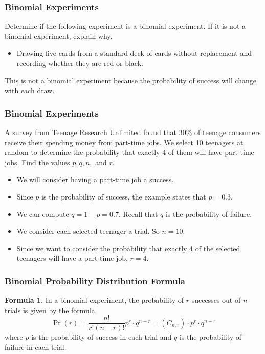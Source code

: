 \documentclass{beamer}
\theoremstyle{definition}
\newtheorem{formula}{Formula}
\begin{document}
\begin{frame}
\frametitle{Binomial Experiments}
\begin{example}
Determine if the following experiment  is a binomial experiment.  If it is not a binomial experiment, explain why.
\begin{itemize}
\item Drawing five cards from a standard deck of cards without replacement and recording whether they are red or black.
\end{itemize}
\end{example}\pause
This is not a binomial experiment because the probability of success will change with each draw.
\vspace*{3in}
\end{frame}

\begin{frame}
\frametitle{Binomial Experiments}\pause
\begin{example}
A survey from Teenage Research Unlimited found that $30 \%$ of
teenage consumers receive their spending money from part-time jobs.
We select 10 teenagers at random to determine the probability that exactly 4 of them will have part-time jobs.  Find the values $p,q,n,$ and $r$.
\end{example}\pause
\begin{itemize}
\item We will consider having a part-time job a success.\pause
\item Since $p$ is the probability of success, the example states that $p=0.3$.\pause
\item We can compute $q=1-p=0.7$.  Recall that $q$ is the probability of failure.\pause
\item We consider each selected teenager a trial.  So $n=10$.\pause
\item Since we want to consider the probability that exactly 4 of the selected teenagers will have a part-time job, $r=4$.
\end{itemize}
\end{frame}

\begin{frame}
\frametitle{Binomial Probability Distribution Formula}\pause
\begin{formula}
In a binomial experiment, the probability of $r$ successes out of $n$ trials is given by the formula
$$\Pr(r)=\frac{n!}{r!(n-r)!}p^r\cdot q^{n-r}=(C_{n,r})\cdot p^r\cdot q^{n-r}$$
where $p$ is the probability of success in each trial and $q$ is the probability of failure in each trial.
\end{formula}
\end{frame}
\end{document}
